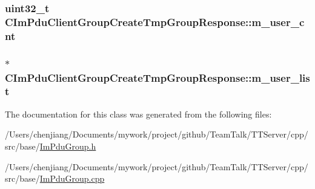 \subsubsection[{m\+\_\+user\+\_\+cnt}]{\setlength{\rightskip}{0pt plus 5cm}uint32\+\_\+t C\+Im\+Pdu\+Client\+Group\+Create\+Tmp\+Group\+Response\+::m\+\_\+user\+\_\+cnt\hspace{0.3cm}{\ttfamily [private]}}\label{class_c_im_pdu_client_group_create_tmp_group_response_a00427349d1b3d42471b4520e940c4755}
\hypertarget{class_c_im_pdu_client_group_create_tmp_group_response_aa1ff7ef4b9764b4684c2f9c8c4931433}{}
\subsubsection[{m\+\_\+user\+\_\+list}]{$\ast$ C\+Im\+Pdu\+Client\+Group\+Create\+Tmp\+Group\+Response\+::m\+\_\+user\+\_\+list\hspace{0.3cm}{\ttfamily [private]}}\label{class_c_im_pdu_client_group_create_tmp_group_response_aa1ff7ef4b9764b4684c2f9c8c4931433}


The documentation for this class was generated from the following files\+:\begin{DoxyCompactItemize}
\item 
/\+Users/chenjiang/\+Documents/mywork/project/github/\+Team\+Talk/\+T\+T\+Server/cpp/src/base/\hyperlink{_im_pdu_group_8h}{Im\+Pdu\+Group.\+h}\item 
/\+Users/chenjiang/\+Documents/mywork/project/github/\+Team\+Talk/\+T\+T\+Server/cpp/src/base/\hyperlink{_im_pdu_group_8cpp}{Im\+Pdu\+Group.\+cpp}\end{DoxyCompactItemize}
